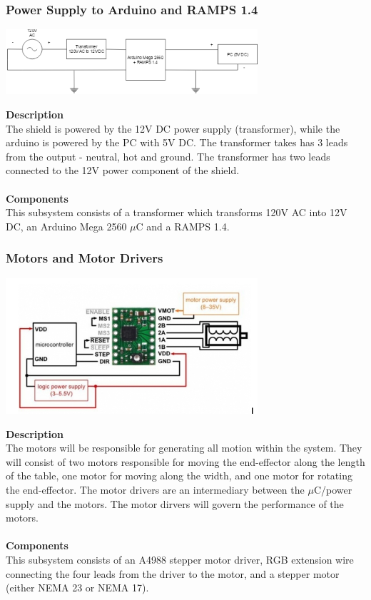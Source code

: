 \documentclass[titlepage]{article}
\begin{document}
\newpage
\subsubsection{Power Supply to Arduino and RAMPS 1.4}
\begin{center}
	\includegraphics[width = 0.7\textwidth]{PowerSupply.png}
\label{fig:PowerSupplyFig}
\end{center}
\textbf{Description}\\
The shield is powered by the 12V DC power supply (transformer), while the arduino is powered by the PC with 5V DC. The transformer takes has 3 leads from the output - neutral, hot and ground. The transformer has two leads connected to the 12V power component of the shield.\\\\
\textbf{Components}\\
This subsystem consists of a transformer which transforms 120V AC into 12V DC, an Arduino Mega 2560 $\mu$C and a RAMPS 1.4.

\subsubsection{Motors and Motor Drivers}
\begin{center}
	\includegraphics[width = 0.7\textwidth]{Motors.png}
\label{fig:MotorsFig}
\end{center}
\textbf{Description}\\
The motors will be responsible for generating all motion within the system. They will consist of two motors responsible for moving the end-effector along the length of the table, one motor for moving along the width, and one motor for rotating the end-effector. The motor drivers are an intermediary between the $\mu$C/power supply and the motors. The motor dirvers will govern the performance of the motors.\\\\
\textbf{Components}\\
This subsystem consists of an A4988 stepper motor driver, RGB extension wire connecting the four leads from the driver to the motor, and a stepper motor (either NEMA 23 or NEMA 17).
\end{document}
